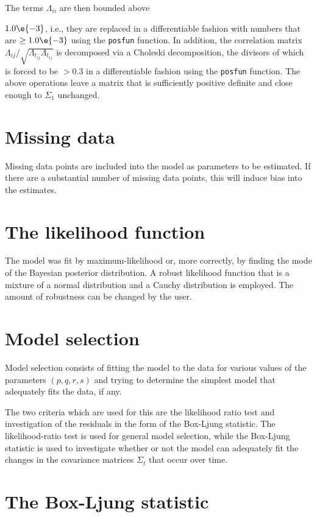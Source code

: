 The terms $\Lambda_{ii}$ are then bounded above {$1.0\e{-3}$,  i.e., they are replaced in a differentiable fashion with numbers that are $\ge 1.0\e{-3}$ using
the \texttt{posfun} function.
In addition, the correlation matrix 
$\Lambda_{ij}/\sqrt{\Lambda_{t_{ij}}\Lambda_{t_{ij}}}$ is
decomposed via a Choleski decomposition, the divisors of
 which is forced to be $> 0.3$ in a differentiable fashion using the
\texttt{posfun} function.
The
above operations leave a matrix that is sufficiently positive definite
and close enough to $\Sigma_1$ unchanged.


\section{Missing data}

Missing data points are included into the model as parameters to
be estimated. If there are a substantial number of missing data
points, this will induce bias into the estimates.


\section{The likelihood function}

The model was fit by maximum-likelihood or, more correctly, by
finding the mode of the Bayesian posterior distribution.
A robust likelihood function that is a mixture of a normal
distribution and a Cauchy distribution is employed.  The amount of robustness
can be changed by the user.


\section{Model selection}

Model selection consists of fitting the model to the data for various values
of the parameters $(p,q,r,s)$ and trying to determine the simplest model
that adequately fits the data, if any. 

The two criteria which are used for this are the likelihood ratio test
and investigation of the residuals in the form of the Box-Ljung statistic.
The likelihood-ratio test is used for general model selection, while
the Box-Ljung statistic is used to investigate whether or not the model
can adequately fit the changes in the covariance matrices $\Sigma_t$
that occur over time.


\section{The Box-Ljung statistic}

}
